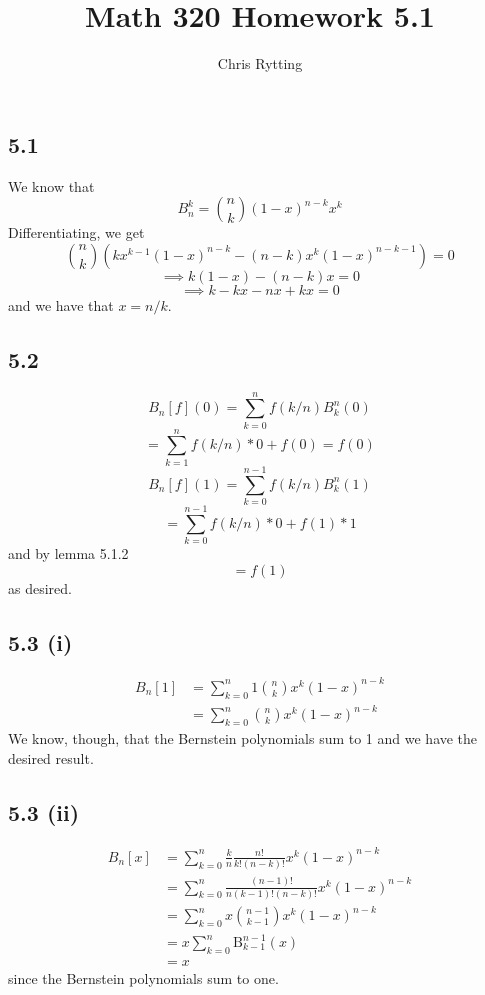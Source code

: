 \documentclass[letterpaper,12pt]{article}
\theoremstyle{definition}
\begin{document}
\title{Math 320 Homework 5.1}
\author{Chris Rytting}
\maketitle

\subsection*{5.1}


We know that 
\[B^{k}_{n} = \binom nk (1-x)^{n-k} x^k \]
Differentiating, we get
\[\binom nk (kx^{k-1}(1-x)^{n-k}-(n-k)x^k(1-x)^{n-k-1}) = 0\]
\[\implies k(1-x)-(n-k)x = 0\]
\[\implies k-kx-nx+kx = 0\]
and we have that $x = n/k$.

\subsection*{5.2}


\[B_n[f](0) = \sum_{k=0}^n f(k/n)B^n_k(0)\]
\[=\sum_{k=1}^{n}f(k/n)*0 + f(0) = f(0)\]
\[B_n[f](1) = \sum_{k=0}^{n-1} f(k/n)B_k^n(1)\]
\[=\sum_{k=0}^{n-1}f(k/n)*0+f(1)*1\]
and by lemma 5.1.2
\[= f(1)\]
as desired.

\subsection*{5.3 (i)}
\begin{align*}
B_n[1] &= \sum ^n _{k=0} 1 \binom nk x^k (1-x)^{n-k} \\
&= \sum^n_{k=0}\binom nk x^k (1-x)^{n-k}
\end{align*}
We know, though, that the Bernstein polynomials sum to 1 and we have the desired result.

\subsection*{5.3 (ii)}


\begin{align*}
    B_n[x] &= \sum_{k=0}^n \frac{k}{n} \frac{n!}{k!(n-k)!} x^k (1-x)^{n-k} \\
    &= \sum_{k=0}^n \frac{(n-1)!}{n(k-1)!(n-k)!} x^k (1-x)^{n-k} \\
    &= \sum_{k=0}^n x \binom{n-1}{k-1} x^k (1-x)^{n-k} \\
    &= x \sum_{k=0}^n \text{B}_{k-1}^{n-1}(x)\\
    &= x
\end{align*}
since the Bernstein polynomials sum to one.
\end{document}
